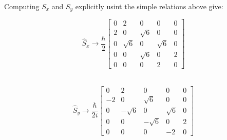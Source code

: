 \documentclass[9pt]{extarticle}
\begin{document}
\begin{multicols*}{2}
Computing $S_x$ and $S_y$ explicitly usint the simple relations above give:

$$
\hat S_x \rightarrow \frac \hbar 2
\begin{bmatrix}
	0 & 2 & 0 & 0 & 0 \\ 
        2 & 0 & \sqrt 6 & 0 & 0 \\ 
        0 & \sqrt 6 & 0 & \sqrt 6 & 0 \\ 
        0 & 0 & \sqrt 6 & 0 & 2 \\ 
        0 & 0 & 0 & 2 & 0
\end{bmatrix}
$$ \ 

$$
\hat S_y \rightarrow \frac{\hbar}{2i}
\begin{bmatrix}
        0 & 2 & 0 & 0 & 0 \\
        -2 & 0 & \sqrt 6 & 0 & 0 \\
        0 & -\sqrt 6 & 0 & \sqrt 6 & 0 \\
        0 & 0 & -\sqrt 6 & 0 & 2 \\
        0 & 0 & 0 & -2 & 0
\end{bmatrix}
$$ \

\end{multicols*}
\end{document}
